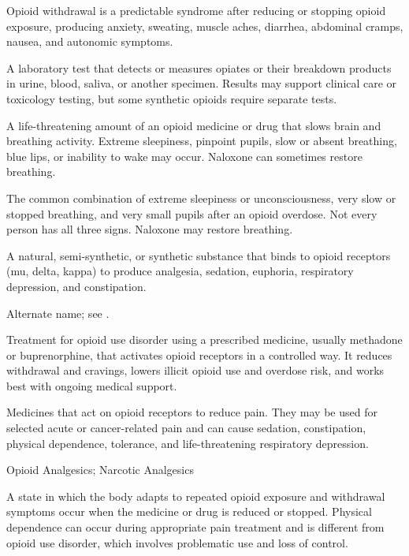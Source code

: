  Opioid withdrawal is a predictable syndrome after reducing or stopping opioid exposure, producing anxiety, sweating, muscle aches, diarrhea, abdominal cramps, nausea, and autonomic symptoms.

 A laboratory test that detects or measures opiates or their breakdown products in urine, blood, saliva, or another specimen. Results may support clinical care or toxicology testing, but some synthetic opioids require separate tests.

 A life-threatening amount of an opioid medicine or drug that slows brain and breathing activity. Extreme sleepiness, pinpoint pupils, slow or absent breathing, blue lips, or inability to wake may occur. Naloxone can sometimes restore breathing.

 The common combination of extreme sleepiness or unconsciousness, very slow or stopped breathing, and very small pupils after an opioid overdose. Not every person has all three signs. Naloxone may restore breathing.

 A natural, semi-synthetic, or synthetic substance that binds to opioid receptors (mu, delta, kappa) to produce analgesia, sedation, euphoria, respiratory depression, and constipation.

 Alternate name; see .

 Treatment for opioid use disorder using a prescribed medicine, usually methadone or buprenorphine, that activates opioid receptors in a controlled way. It reduces withdrawal and cravings, lowers illicit opioid use and overdose risk, and works best with ongoing medical support.

 Medicines that act on opioid receptors to reduce pain. They may be used for selected acute or cancer-related pain and can cause sedation, constipation, physical dependence, tolerance, and life-threatening respiratory depression.

\synonyms
Opioid Analgesics; Narcotic Analgesics

 A state in which the body adapts to repeated opioid exposure and withdrawal symptoms occur when the medicine or drug is reduced or stopped. Physical dependence can occur during appropriate pain treatment and is different from opioid use disorder, which involves problematic use and loss of control.

